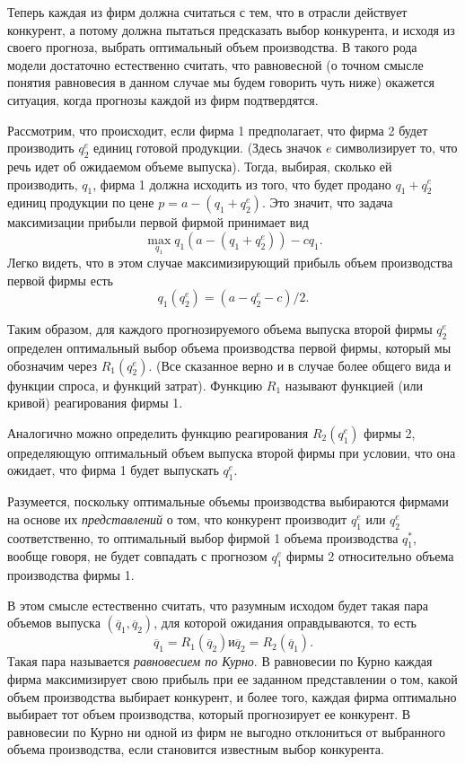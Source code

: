 Теперь каждая из фирм должна считаться с тем, что в отрасли действует
конкурент, а потому должна пытаться предсказать выбор конкурента, и
исходя из своего прогноза, выбрать оптимальный объем производства. В
такого рода модели достаточно естественно считать, что равновесной
(о точном смысле понятия равновесия в данном случае мы будем говорить
чуть ниже) окажется ситуация, когда прогнозы каждой из фирм подтвердятся.

Рассмотрим, что происходит, если фирма 1 предполагает, что фирма 2
будет производить $q^e_2$ единиц готовой продукции. (Здесь значок $e$
символизирует то, что речь идет об ожидаемом объеме выпуска). Тогда, выбирая,
сколько ей производить, $q_1$, фирма 1 должна исходить из того, что
будет продано $q_1 + q^e_2$ единиц продукции по цене $p=a-(q_1 +
q^e_2)$. Это значит, что задача максимизации прибыли первой фирмой
принимает вид
$$
\max_{q_1}q_1(a-(q_1 + q^e_2))-cq_1.
$$
Легко видеть, что в этом случае максимизирующий прибыль объем
производства первой фирмы есть
$$
q_1(q^e_2)=(a-q^e_2-c)/2.
$$

Таким образом, для каждого прогнозируемого объема выпуска второй
фирмы  $q^e_2$ определен оптимальный выбор объема производства
первой фирмы, который мы обозначим через $R_1(q^e_2)$. (Все
сказанное верно и в случае более общего вида и функции спроса, и
функций затрат). Функцию $R_1$ называют функцией (или кривой)
реагирования фирмы 1.

Аналогично можно определить функцию реагирования $R_2(q^e_1)$ фирмы
2, определяющую оптимальный объем выпуска второй фирмы при условии,
что она ожидает, что фирма 1 будет выпускать $q^e_1$.

Разумеется, поскольку оптимальные объемы производства выбираются
фирмами на основе их \emph{представлений} о том, что конкурент
производит $q^e_1$ или $q^e_2$ соответственно, то оптимальный выбор
фирмой 1 объема производства $q^*_1$, вообще говоря, не будет
совпадать с прогнозом $q^e_1$ фирмы 2 относительно объема производства
фирмы 1.

В этом смысле естественно считать, что разумным исходом будет такая
пара объемов выпуска $(\overline{q}_1, \overline{q}_2)$, для которой
ожидания оправдываются, то есть
$$
\overline{q}_1=R_1(\overline{q}_2) и
\overline{q}_2=R_2(\overline{q}_1). $$ Такая пара называется
\emph{равновесием по Курно}. В равновесии по Курно каждая фирма
максимизирует свою прибыль при ее заданном представлении о том,
какой объем производства выбирает конкурент, и более того, каждая
фирма оптимально выбирает тот объем производства, который
прогнозирует ее конкурент. В равновесии по Курно ни одной из фирм не
выгодно отклониться от выбранного объема производства, если
становится известным выбор конкурента.

